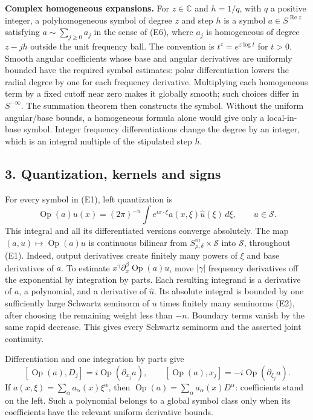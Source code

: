 \documentclass[
  11pt,
]{article}
\begin{document}
\textbf{Complex homogeneous expansions.} For \(z\in\mathbb C\) and
\(h=1/q\), with \(q\) a positive integer, a polyhomogeneous symbol of
degree \(z\) and step \(h\) is a symbol \(a\in S^{\operatorname{Re}z}\)
satisfying \(a\sim\sum_{j\geq0}a_j\) in the sense of (E6), where \(a_j\)
is homogeneous of degree \(z-jh\) outside the unit frequency ball. The
convention is \(t^z=e^{z\log t}\) for \(t>0\). Smooth angular
coefficients whose base and angular derivatives are uniformly bounded
have the required symbol estimates: polar differentiation lowers the
radial degree by one for each frequency derivative. Multiplying each
homogeneous term by a fixed cutoff near zero makes it globally smooth;
such choices differ in \(S^{-\infty}\). The summation theorem then
constructs the symbol. Without the uniform angular/base bounds, a
homogeneous formula alone would give only a local-in-base symbol.
Integer frequency differentiations change the degree by an integer,
which is an integral multiple of the stipulated step \(h\).

\subsection{3. Quantization, kernels and
signs}\label{quantization-kernels-and-signs}

For every symbol in (E1), left quantization is \[
\operatorname{Op}(a)u(x)=(2\pi)^{-n}
\int e^{ix\cdot\xi}a(x,\xi)\widehat u(\xi)\,d\xi,
\qquad u\in\mathcal S.
\tag{E10}
\] This integral and all its differentiated versions converge
absolutely. The map \((a,u)\mapsto\operatorname{Op}(a)u\) is continuous
bilinear from \(S^m_{\rho,\delta}\times\mathcal S\) into \(\mathcal S\),
throughout (E1). Indeed, output derivatives create finitely many powers
of \(\xi\) and base derivatives of \(a\). To estimate
\(x^\gamma\partial_x^\beta\operatorname{Op}(a)u\), move \(|\gamma|\)
frequency derivatives off the exponential by integration by parts. Each
resulting integrand is a derivative of \(a\), a polynomial, and a
derivative of \(\widehat u\). Its absolute integral is bounded by one
sufficiently large Schwartz seminorm of \(u\) times finitely many
seminorms (E2), after choosing the remaining weight less than \(-n\).
Boundary terms vanish by the same rapid decrease. This gives every
Schwartz seminorm and the asserted joint continuity.

Differentiation and one integration by parts give \[
[\operatorname{Op}(a),D_j]=i\operatorname{Op}(\partial_{x_j}a),
\qquad
[\operatorname{Op}(a),x_j]=-i\operatorname{Op}(\partial_{\xi_j}a).
\tag{E11}
\] If \(a(x,\xi)=\sum_\alpha a_\alpha(x)\xi^\alpha\), then
\(\operatorname{Op}(a)=\sum_\alpha a_\alpha(x)D^\alpha\): coefficients
stand on the left. Such a polynomial belongs to a global symbol class
only when its coefficients have the relevant uniform derivative bounds.
\end{document}
